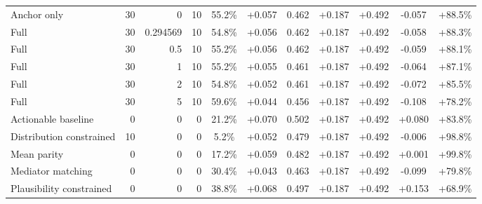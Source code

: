 \begin{table}[htbp]
\begin{tabular}{lrrrccccccc}
Anchor only & 30 & 0 & 10 & 55.2\% & +0.057 & 0.462 & +0.187 & +0.492 & -0.057 & +88.5\% \\
Full & 30 & 0.294569 & 10 & 54.8\% & +0.056 & 0.462 & +0.187 & +0.492 & -0.058 & +88.3\% \\
Full & 30 & 0.5 & 10 & 55.2\% & +0.056 & 0.462 & +0.187 & +0.492 & -0.059 & +88.1\% \\
Full & 30 & 1 & 10 & 55.2\% & +0.055 & 0.461 & +0.187 & +0.492 & -0.064 & +87.1\% \\
Full & 30 & 2 & 10 & 54.8\% & +0.052 & 0.461 & +0.187 & +0.492 & -0.072 & +85.5\% \\
Full & 30 & 5 & 10 & 59.6\% & +0.044 & 0.456 & +0.187 & +0.492 & -0.108 & +78.2\% \\
Actionable baseline & 0 & 0 & 0 & 21.2\% & +0.070 & 0.502 & +0.187 & +0.492 & +0.080 & +83.8\% \\
Distribution constrained & 10 & 0 & 0 & 5.2\% & +0.052 & 0.479 & +0.187 & +0.492 & -0.006 & +98.8\% \\
Mean parity & 0 & 0 & 0 & 17.2\% & +0.059 & 0.482 & +0.187 & +0.492 & +0.001 & +99.8\% \\
Mediator matching & 0 & 0 & 0 & 30.4\% & +0.043 & 0.463 & +0.187 & +0.492 & -0.099 & +79.8\% \\
Plausibility constrained & 0 & 0 & 0 & 38.8\% & +0.068 & 0.497 & +0.187 & +0.492 & +0.153 & +68.9\% \\
\bottomrule
\end{tabular}
\end{table}